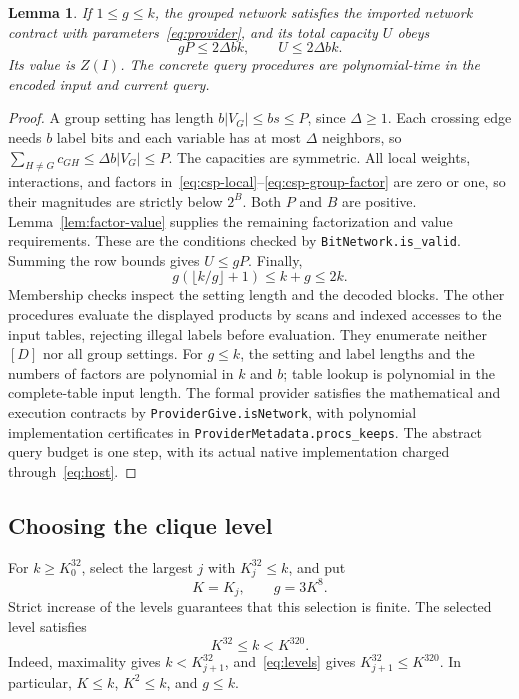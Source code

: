 \documentclass[11pt,reqno]{amsart}
\numberwithin{equation}{section}
\newtheorem{lemma}[theorem]{Lemma}
\theoremstyle{definition}
\theoremstyle{remark}
\begin{document}
\begin{lemma}\label{lem:volume}
If $1\le g\le k$, the grouped network satisfies the imported network contract with parameters~\eqref{eq:provider}, and its total capacity $U$ obeys
\begin{equation}\label{eq:volume}
 gP\le2\Delta bk,\qquad U\le2\Delta bk.
\end{equation}
Its value is $Z(I)$. The concrete query procedures are polynomial-time in the encoded input and current query.
\end{lemma}
\begin{proof}
A group setting has length $b|V_G|\le bs\le P$, since $\Delta\ge1$. Each crossing edge needs $b$ label bits and each variable has at most $\Delta$ neighbors, so $\sum_{H\ne G}c_{GH}\le\Delta b|V_G|\le P$. The capacities are symmetric. All local weights, interactions, and factors in~\eqref{eq:csp-local}--\eqref{eq:csp-group-factor} are zero or one, so their magnitudes are strictly below $2^B$. Both $P$ and $B$ are positive. Lemma~\ref{lem:factor-value} supplies the remaining factorization and value requirements. These are the conditions checked by \texttt{BitNetwork.is\_valid}. Summing the row bounds gives $U\le gP$. Finally,
\[
 g(\lfloor k/g\rfloor+1)\le k+g\le2k.
\]
Membership checks inspect the setting length and the decoded blocks. The other procedures evaluate the displayed products by scans and indexed accesses to the input tables, rejecting illegal labels before evaluation. They enumerate neither $[D]$ nor all group settings. For $g\le k$, the setting and label lengths and the numbers of factors are polynomial in $k$ and $b$; table lookup is polynomial in the complete-table input length. The formal provider satisfies the mathematical and execution contracts by \texttt{ProviderGive.isNetwork}, with polynomial implementation certificates in \texttt{ProviderMetadata.procs\_keeps}. The abstract query budget is one step, with its actual native implementation charged through~\eqref{eq:host}.
\end{proof}

\subsection{Choosing the clique level}

For $k\ge K_0^{32}$, select the largest $j$ with $K_j^{32}\le k$, and put
\begin{equation}\label{eq:selection}
 K=K_j,\qquad g=3K^8.
\end{equation}
Strict increase of the levels guarantees that this selection is finite. The selected level satisfies
\begin{equation}\label{eq:window}
 K^{32}\le k<K^{320}.
\end{equation}
Indeed, maximality gives $k<K_{j+1}^{32}$, and~\eqref{eq:levels} gives $K_{j+1}^{32}\le K^{320}$. In particular, $K\le k$, $K^2\le k$, and $g\le k$.
\end{document}
